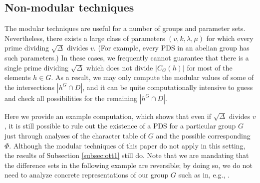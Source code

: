 \documentclass[12pt]{amsproc} %
\theoremstyle{definition}\newtheorem{defn}[thm]{Definition}
\theoremstyle{definition}\newtheorem{rem}[thm]{Remark}
\theoremstyle{definition}\newtheorem{ex}[thm]{Example}
\begin{document}
\subsection{Non-modular techniques}\label{Non-modular-techniques}
The modular techniques are useful for a number of groups and parameter sets. Nevertheless, there exists a large class of parameters $(v, k, \lambda, \mu)$ for which every prime dividing $\sqrt\Delta$ divides $v$. (For example, every PDS in an abelian group has such parameters.) In these cases, we frequently cannot guarantee that there is a single prime dividing $\sqrt\Delta$ which does not divide $|C_G(h)|$ for most of the elements $h \in G$. As a result, we may only compute the modular values of some of the intersections $|h^G \cap D|$, and it can be quite computationally intensive to guess and check all possibilities for the remaining $|h^G \cap D|$.

Here we provide an example computation, which shows that even if $\sqrt\Delta$ divides $v$, it is still possible to rule out the existence of a PDS for a particular group $G$ just through analyses of the character table of $G$ and the possible corresponding $\Phi$.   Although the modular techniques of this paper do not apply in this setting, the results of Subsection \ref{subsec:ott1} still do.  Note that we are mandating that the difference sets in the following example are reversible; by doing so, we do not need to analyze concrete representations of our group $G$ such as in, e.g., \cite{Liebler, Smith}.
\end{document}
